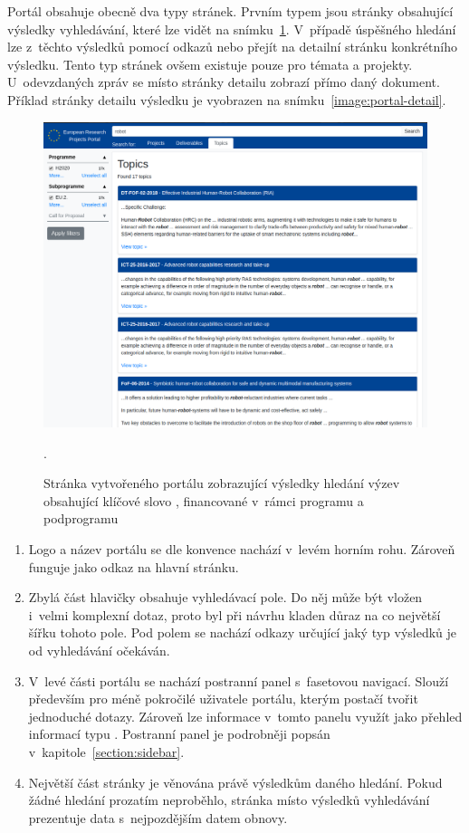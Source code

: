 Portál obsahuje obecně dva typy stránek. Prvním typem jsou stránky obsahující výsledky vyhledávání, které lze vidět na snímku~\ref{image:portal-results}. V~případě úspěšného hledání lze z~těchto výsledků pomocí odkazů  nebo  přejít na detailní stránku konkrétního výsledku. Tento typ stránek ovšem existuje pouze pro témata a projekty. U~odevzdaných zpráv se místo stránky detailu zobrazí přímo daný dokument. Příklad stránky detailu výsledku je vyobrazen na snímku~\ref{image:portal-detail}.

\begin{figure}[H]
	\centering
	\includegraphics[width=\textwidth]{obrazky-figures/my-results.png}
	\caption{Stránka vytvořeného portálu zobrazující výsledky hledání výzev obsahující klíčové slovo , financované v~rámci programu  a podprogramu }.
	\label{image:portal-results}
\end{figure}
\begin{enumerate}
    \item Logo a název portálu se dle konvence nachází v~levém horním rohu. Zároveň funguje jako odkaz na hlavní stránku.
    \item Zbylá část hlavičky obsahuje vyhledávací pole. Do něj může být vložen i~velmi komplexní dotaz, proto byl při návrhu kladen důraz na co největší šířku tohoto pole. Pod polem se nachází odkazy určující jaký typ výsledků je od vyhledávání očekáván.
    \item V~levé části portálu se nachází postranní panel s~fasetovou navigací. Slouží především pro méně pokročilé uživatele portálu, kterým postačí tvořit jednoduché dotazy. Zároveň lze informace v~tomto panelu využít jako přehled informací typu . Postranní panel je podrobněji popsán v~kapitole~\ref{section:sidebar}.
    \item Největší část stránky je věnována právě výsledkům daného hledání. Pokud žádné hledání prozatím neproběhlo, stránka místo výsledků vyhledávání prezentuje data s~nejpozdějším datem obnovy.
\end{enumerate}


